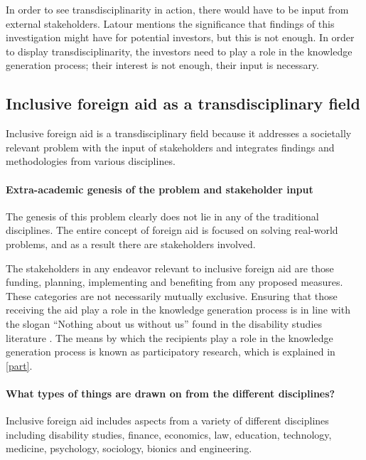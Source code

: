 \documentclass[a4paper]{article}
\begin{document}
In order to see transdisciplinarity in action, there would have to be input
from external stakeholders. Latour mentions the significance that findings of
this investigation might have for potential investors, but this is not enough.
In order to display transdisciplinarity, the investors need to play a role in
the knowledge generation process; their interest is not enough, their input is
necessary.

\subsection{Inclusive foreign aid as a transdisciplinary field}

Inclusive foreign aid is a transdisciplinary field because it addresses a
societally relevant problem with the input of stakeholders and integrates
findings and methodologies from various disciplines.

\paragraph{Extra-academic genesis of the problem and stakeholder input}

The genesis of this problem clearly does not lie in any of the traditional
disciplines. The entire concept of foreign aid is focused on solving
real-world problems, and as a result there are stakeholders involved.

The stakeholders in any endeavor relevant to inclusive foreign aid are those
funding, planning, implementing and benefiting from any proposed measures.
These categories are not necessarily mutually exclusive. Ensuring that those
receiving the aid play a role in the knowledge generation process is in line
with the slogan ``Nothing about us without us'' found in the disability
studies literature \citep{pfeiffer2000disability}. The means by which the
recipients play a role in the knowledge generation process is known as
participatory research, which is explained in \autoref{part}.

\paragraph{What types of things are drawn on from the different disciplines?}

Inclusive foreign aid includes aspects from a variety of different disciplines
including disability studies, finance, economics, law, education, technology,
medicine, psychology, sociology, bionics and engineering. 
\end{document}

